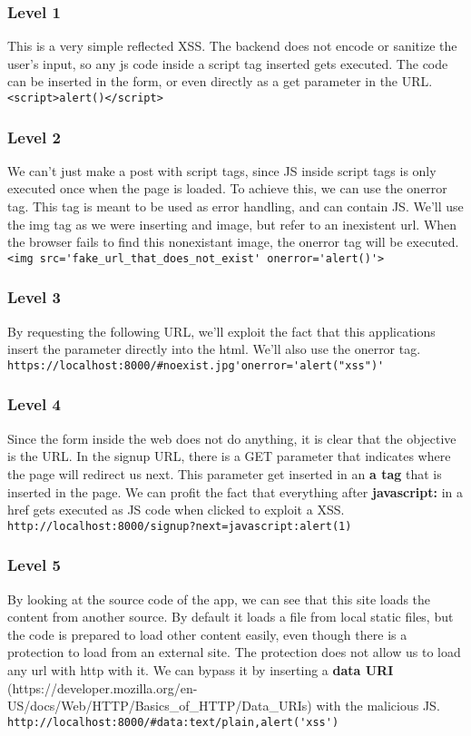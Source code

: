 \begin{Answer}[ref={websec-xss-game}]
	\subsubsection{Level 1}
	This is a very simple reflected XSS. The backend does not encode or sanitize the user's input, so any js code inside a script tag inserted gets executed. The code can be inserted in the form, or even directly as a get parameter in the URL.
	\verb|<script>alert()</script>|
	\subsubsection{Level 2}
	We can't just make a post with script tags, since JS inside script tags is only executed once when the page is loaded. To achieve this, we can use the onerror tag. This tag is meant to be used as error handling, and can contain JS. We'll use the img tag as we were inserting and image, but refer to an inexistent url. When the browser fails to find this nonexistant image, the onerror tag will be executed.
	\verb|<img src='fake_url_that_does_not_exist' onerror='alert()'>|
	\subsubsection{Level 3}
	By requesting the following URL, we'll exploit the fact that this applications insert the parameter directly into the html. We'll also use the onerror tag.
	\verb|https://localhost:8000/#noexist.jpg'onerror='alert("xss")'|
	\subsubsection{Level 4}
	Since the form inside the web does not do anything, it is clear that the objective is the URL. In the signup URL, there is a GET parameter that indicates where the page will redirect us next. This parameter get inserted in an \textbf{a tag} that is inserted in the page. We can profit the fact that everything after \textbf{javascript:} in a href gets executed as JS code when clicked to exploit a XSS.
	\verb|http://localhost:8000/signup?next=javascript:alert(1)|
	\subsubsection{Level 5}
	By looking at the source code of the app, we can see that this site loads the content from another source. By default it loads a file from local static files, but the code is prepared to load other content easily, even though there is a protection to load from an external site. The protection does not allow us to load any url with http with it. We can bypass it by inserting a \textbf{data URI} (https://developer.mozilla.org/en-US/docs/Web/HTTP/Basics_of_HTTP/Data_URIs)  with the malicious JS.
	\verb|http://localhost:8000/#data:text/plain,alert('xss')|
\end{Answer}